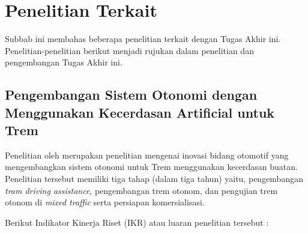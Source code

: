 \section{Penelitian Terkait}

Subbab ini membahas beberapa penelitian terkait dengan Tugas Akhir ini.
Penelitian-penelitian berikut menjadi rujukan dalam penelitian dan pengembangan
Tugas Akhir ini.

\subsection{Pengembangan Sistem Otonomi dengan Menggunakan Kecerdasan Artificial untuk Trem}
\label{subsec:rispro-trilaksono}

Penelitian oleh \cite{rispro-trilaksono} merupakan penelitian mengenai inovasi
bidang otomotif yang mengembangkan sistem otonomi untuk Trem menggunakan
kecerdasan buatan. Penelitian tersebut memiliki tiga tahap (dalam tiga tahun)
yaitu, pengembangan \textit{tram driving assistance}, pengembangan trem otonom,
dan pengujian trem otonom di \textit{mixed traffic} serta persiapan
komersialisasi.

Berikut Indikator Kinerja Riset (IKR) atau luaran penelitian tersebut
\parencite{rispro-trilaksono}:

